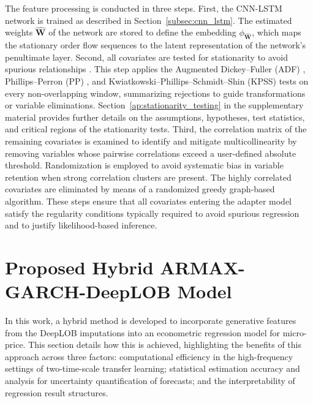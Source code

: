 \documentclass{rQUF2e}
\theoremstyle{plain}
\theoremstyle{definition}
\theoremstyle{remark}
\begin{document}
The feature processing is conducted in three steps. First, the CNN-LSTM network is trained as described in Section~\ref{subsec:cnn_lstm}. The estimated weights $\hat{\mathbf{W}}$ of the network are stored to define the embedding $\phi_{\hat{\mathbf{W}}}$, which maps the stationary order flow sequences to the latent representation of the network's penultimate layer. Second, all covariates are tested for stationarity to avoid spurious relationships \citep{granger1974spurious, phillips1986understanding}. This step applies the Augmented Dickey--Fuller (ADF) \citep{said1984testing, hamilton_time_1994, banerjee1993co}, Phillips--Perron (PP) \citep{phillips1986understanding, hamilton_time_1994, banerjee1993co}, and Kwiatkowski--Phillips--Schmidt--Shin (KPSS) \citep{kwiatkowski1992testing} tests on every non-overlapping window, summarizing rejections to guide transformations or variable eliminations. Section~\ref{ap:stationarity_testing} in the supplementary material provides further details on the assumptions, hypotheses, test statistics, and critical regions of the stationarity tests. Third, the correlation matrix of the remaining covariates is examined to identify and mitigate multicollinearity by removing variables whose pairwise correlations exceed a user-defined absolute threshold. Randomization is employed to avoid systematic bias in variable retention when strong correlation clusters are present. The highly correlated covariates are eliminated by means of a randomized greedy graph-based algorithm. These steps ensure that all covariates entering the adapter model satisfy the regularity conditions typically required to avoid spurious regression and to justify likelihood-based inference.

\section{Proposed Hybrid ARMAX-GARCH-DeepLOB Model}
\label{subsec:armax_garch_paper}
In this work, a hybrid method is developed to incorporate generative features from the DeepLOB imputations into an econometric regression model for micro-price. This section details how this is achieved, highlighting the benefits of this approach across three factors: computational efficiency in the high-frequency settings of two-time-scale transfer learning; statistical estimation accuracy and analysis for uncertainty quantification of forecasts; and the interpretability of regression result structures.
\end{document}
